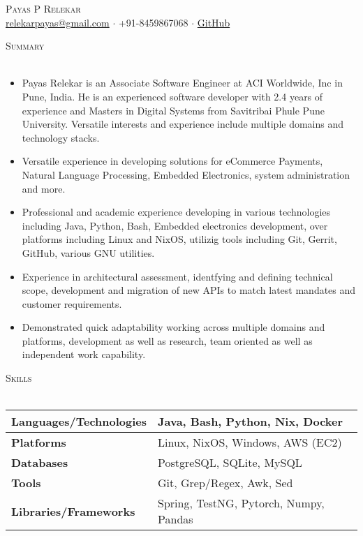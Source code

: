 \documentclass[a4paper]{article}
\newcommand{\lineunder} {
    \vspace*{-8pt} \\
    \hspace*{-18pt} \hrulefill \\
}
\newcommand{\header} [1] {
    {\hspace*{-18pt}\vspace*{6pt} \textsc{#1}}
    \vspace*{-6pt} \lineunder
}
\begin{document}
\vspace*{-40pt}

\vspace*{-10pt}
\begin{center}
	{\Huge \scshape {Payas P Relekar}}\\
	\href{mailto:relekarpayas@gmail.com}{relekarpayas@gmail.com} $\cdot$ +91-8459867068 $\cdot$ \href{https://github.com/remedialchaos/}{GitHub}\\
\end{center}

\header{Summary}
\vspace{1mm}

\begin{itemize} \itemsep 1pt
  \item Payas Relekar is an Associate Software Engineer at ACI Worldwide, Inc in Pune, India. He is an experienced software developer with 2.4 years of experience and Masters in Digital Systems from Savitribai Phule Pune University. Versatile interests and experience include multiple domains and technology stacks.
  \item Versatile experience in developing solutions for eCommerce Payments, Natural Language Processing, Embedded Electronics, system administration and more.
  \item Professional and academic experience developing in various technologies including Java, Python, Bash, Embedded electronics development, over platforms including Linux and NixOS, utilizig tools including Git, Gerrit, GitHub, various GNU utilities.
  \item Experience in architectural assessment, identfying and defining technical scope, development and migration of new APIs to match latest mandates and customer requirements.
  \item Demonstrated quick adaptability working across multiple domains and platforms, development as well as research, team oriented as well as independent work capability.
\end{itemize}

\header{Skills}
\vspace{1mm}
\bgroup
\def\arraystretch{1.5}
{\renewcommand{\arraystretch}{1.5}}
\begin{tabularx}{\textwidth}{ | X | X | }
  \hline
	\textbf{Languages/Technologies} & Java, Bash, Python, Nix, Docker        \\
  \hline
	\textbf{Platforms}             & Linux, NixOS, Windows, AWS (EC2)          \\
  \hline
	\textbf{Databases}             & PostgreSQL, SQLite, MySQL             \\
  \hline
	\textbf{Tools}                 & Git, Grep/Regex, Awk, Sed            \\
  \hline
	\textbf{Libraries/Frameworks}  & Spring, TestNG, Pytorch, Numpy, Pandas \\
  \hline
\end{tabularx}
\egroup
\vspace{2mm}
\end{document}
